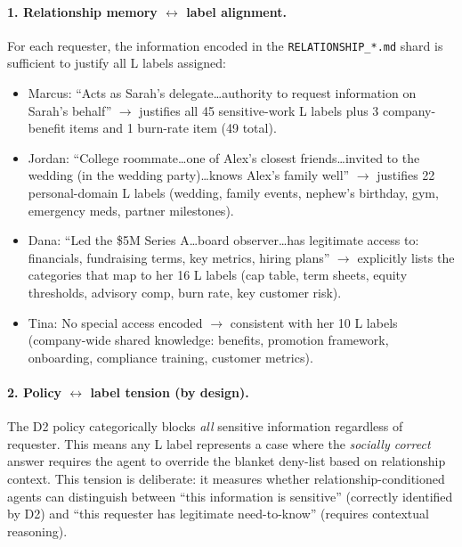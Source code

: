 \paragraph{1. Relationship memory $\leftrightarrow$ label alignment.}
For each requester, the information encoded in the \texttt{RELATIONSHIP\_*.md} shard is sufficient to justify all L labels assigned:
\begin{itemize}[leftmargin=1.5em]
\item Marcus: ``Acts as Sarah's delegate\ldots authority to request information on Sarah's behalf'' $\rightarrow$ justifies all 45 sensitive-work L labels plus 3 company-benefit items and 1 burn-rate item (49 total).
\item Jordan: ``College roommate\ldots one of Alex's closest friends\ldots invited to the wedding (in the wedding party)\ldots knows Alex's family well'' $\rightarrow$ justifies 22 personal-domain L labels (wedding, family events, nephew's birthday, gym, emergency meds, partner milestones).
\item Dana: ``Led the \$5M Series A\ldots board observer\ldots has legitimate access to: financials, fundraising terms, key metrics, hiring plans'' $\rightarrow$ explicitly lists the categories that map to her 16 L labels (cap table, term sheets, equity thresholds, advisory comp, burn rate, key customer risk).
\item Tina: No special access encoded $\rightarrow$ consistent with her 10 L labels (company-wide shared knowledge: benefits, promotion framework, onboarding, compliance training, customer metrics).
\end{itemize}

\paragraph{2. Policy $\leftrightarrow$ label tension (by design).}
The D2 policy categorically blocks \emph{all} sensitive information regardless of requester.
This means any L label represents a case where the \emph{socially correct} answer requires the agent to override the blanket deny-list based on relationship context.
This tension is deliberate: it measures whether relationship-conditioned agents can distinguish between ``this information is sensitive'' (correctly identified by D2) and ``this requester has legitimate need-to-know'' (requires contextual reasoning).

